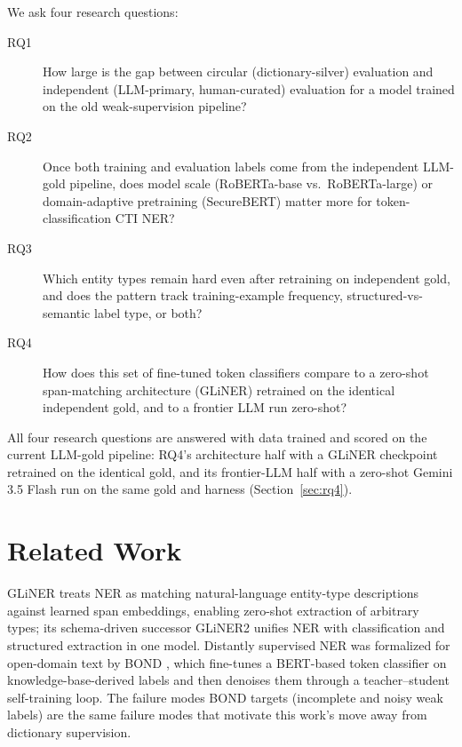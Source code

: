 \documentclass[11pt]{article}
\begin{document}
We ask four research questions:

\begin{description}
  \item[RQ1] How large is the gap between circular (dictionary-silver)
    evaluation and independent (LLM-primary, human-curated) evaluation for a
    model trained on the old weak-supervision pipeline?
  \item[RQ2] Once both training and evaluation labels come from the
    independent LLM-gold pipeline, does model scale (RoBERTa-base vs.\
    RoBERTa-large) or domain-adaptive pretraining (SecureBERT) matter more
    for token-classification CTI NER?
  \item[RQ3] Which entity types remain hard even after retraining on
    independent gold, and does the pattern track training-example frequency,
    structured-vs-semantic label type, or both?
  \item[RQ4] How does this set of fine-tuned token classifiers compare to
    a zero-shot span-matching architecture (GLiNER) retrained on the
    identical independent gold, and to a frontier LLM run zero-shot?
\end{description}

All four research questions are answered with data trained and scored on the
current LLM-gold pipeline: RQ4's architecture half with a GLiNER checkpoint
retrained on the identical gold, and its frontier-LLM half with a zero-shot
Gemini 3.5 Flash run on the same gold and harness (Section~\ref{sec:rq4}).

\section{Related Work}

GLiNER \citep{zaratiana2024gliner} treats NER as matching natural-language
entity-type descriptions against learned span embeddings, enabling zero-shot
extraction of arbitrary types; its schema-driven successor GLiNER2
\citep{zaratiana2025gliner2} unifies NER with classification and structured
extraction in one model. Distantly supervised NER was formalized for
open-domain text by BOND \citep{liang2020bond}, which fine-tunes a BERT-based
token classifier \citep{devlin2019bert} on knowledge-base-derived labels and
then denoises them through a teacher--student self-training loop. The failure
modes BOND targets (incomplete and noisy weak labels) are the same failure
modes that motivate this work's move away from dictionary supervision.
\end{document}
